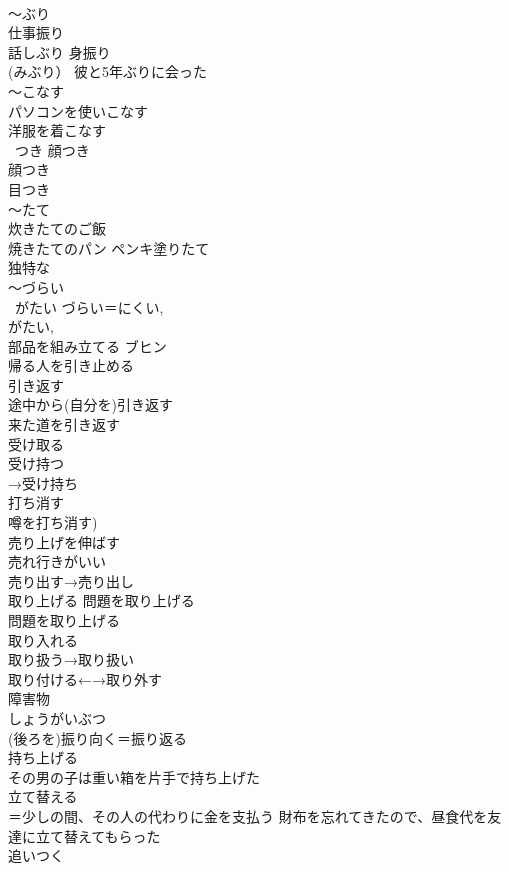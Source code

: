 \documentclass[8pt]{extreport}
\begin{document}
\begin{CJK}{UTF8}{min}
\\	〜ぶり	
\\	仕事振り 
\\	話しぶり 身振り 
\\	(みぶり） 彼と5年ぶりに会った
\\	〜こなす	
\\	パソコンを使いこなす 
\\	洋服を着こなす 
\\	~つき 顔つき	
\\	顔つき 
\\	目つき　
\\	〜たて	
\\	炊きたてのご飯 
\\	焼きたてのパン ペンキ塗りたて 
\\	独特な	
\\	〜づらい
\\	~がたい	づらい＝にくい, 
\\	がたい, 
\\	部品を組み立てる	ブヒン 
\\	帰る人を引き止める	
\\	引き返す	
\\	途中から(自分を)引き返す 
\\	来た道を引き返す 
\\	受け取る	
\\	受け持つ	
\\	→受け持ち 
\\	打ち消す	
\\	噂を打ち消す)
\\	売り上げを伸ばす	
\\	売れ行きがいい	
\\	売り出す→売り出し	
\\	取り上げる 問題を取り上げる	
\\	問題を取り上げる　
\\	取り入れる	
\\	取り扱う→取り扱い	
\\	取り付ける←→取り外す	
\\	障害物	
\\	しょうがいぶつ
\\	(後ろを)振り向く＝振り返る	
\\	持ち上げる	
\\	その男の子は重い箱を片手で持ち上げた
\\	立て替える	
\\	＝少しの間、その人の代わりに金を支払う 財布を忘れてきたので、昼食代を友達に立て替えてもらった
\\	追いつく	

\end{CJK}
\end{document}
